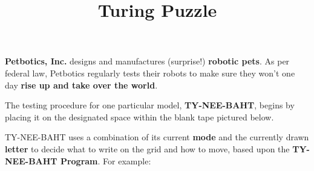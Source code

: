 \documentclass[12pt]{amsart}
\theoremstyle{definition}
\begin{document}
\title{Turing Puzzle}


\maketitle

\thispagestyle{empty}




\textbf{Petbotics, Inc.} designs and manufactures (surprise!)
\textbf{robotic pets}.
As per federal law, Petbotics regularly tests their robots to
make sure they won't one day \textbf{rise up and take over the world}.

The testing procedure for one particular model, \textbf{TY-NEE-BAHT},
begins by placing it on the designated space within the blank tape
pictured below.

\begin{center}
\end{center}

TY-NEE-BAHT uses a combination of its current \textbf{mode} and the
currently drawn \textbf{letter} to decide what to write on the grid and
how to move, based upon the \textbf{TY-NEE-BAHT Program}.
For example:



\newcommand{\phCommandColumn}[5]{
\fill[color=lightgray] (\theXPos,3) rectangle +(1,2);
\draw[step=1] (\theXPos,0) grid +(1,5);
\draw[very thick] (\theXPos,3) -- +(1,0);
\node at (\theXPos.5,4.5) {#1};
\node at (\theXPos.5,3.5) {#2};
\node at (\theXPos.5,2.5) {#3};
\node at (\theXPos.5,1.5) {#4};
\node at (\theXPos.5,0.5) {#5};
\stepcounter{XPos}
}

\begin{center}
\end{center}
\end{document}

